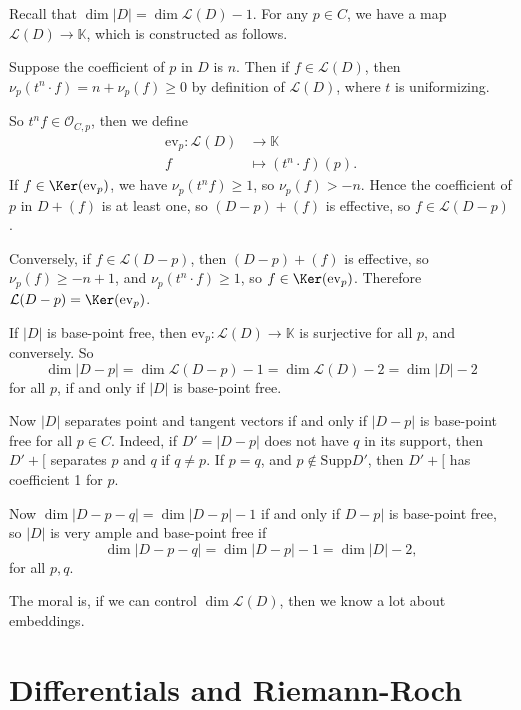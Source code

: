 \documentclass[12pt]{article}
\begin{document}
\begin{proofbox}
	Recall that $\dim |D| = \dim \mathcal{L}(D) - 1$. For any $p \in C$, we have a map $\mathcal{L}(D) \to \mathbb{K}$, which is constructed as follows.

	Suppose the coefficient of $p$ in $D$ is $n$. Then if $f \in \mathcal{L}(D)$, then $\nu_p(t^n \cdot f) = n + \nu_p (f) \geq 0$ by definition of $\mathcal{L}(D)$, where $t$ is uniformizing.

	So $t^n f \in \mathcal{O}_{C, p}$, then we define
	\begin{align*}
		\mathrm{ev}_p : \mathcal{L}(D) &\to \mathbb{K} \\
		f &\mapsto (t^n \cdot f)(p).
	\end{align*}
	If $f \in \Ker(\mathrm{ev}_p)$, we have $\nu_p(t^n f) \geq 1$, so $\nu_p (f) > -n$. Hence the coefficient of $p$ in $D + (f)$ is at least one, so $(D - p) + (f)$ is effective, so $f \in \mathcal{L}(D - p)$.

	Conversely, if $f \in \mathcal{L}(D - p)$, then $(D - p) + (f)$ is effective, so $\nu_p(f) \geq -n + 1$, and $\nu_p(t^n \cdot f) \geq 1$, so $f \in \Ker(\mathrm{ev}_p)$. Therefore $\mathcal{L}(D - p) = \Ker(\mathrm{ev}_p)$.

	If $|D|$ is base-point free, then $\mathrm{ev}_p : \mathcal{L}(D) \to \mathbb{K}$ is surjective for all $p$, and conversely. So
	\[
	\dim |D - p| = \dim \mathcal{L}(D - p) - 1 = \dim \mathcal{L}(D) - 2 = \dim |D| - 2
	\]
	for all $p$, if and only if $|D|$ is base-point free. 

	Now $|D|$ separates point and tangent vectors if and only if $|D - p|$ is base-point free for all $p \in C$. Indeed, if $D' = |D - p|$ does not have $q$ in its support, then $D' + [$ separates $p$ and $q$ if $q \neq p$. If $p = q$, and $p \not \in \mathrm{Supp}D'$, then $D' + [$ has coefficient 1 for $p$.

	Now $\dim |D - p - q| = \dim |D - p| - 1$ if and only if $D - p|$ is base-point free, so $|D|$ is very ample and base-point free if 
	\[
	\dim |D - p - q| = \dim |D - p| - 1 = \dim |D| - 2,
	\]
	for all $p, q$.
\end{proofbox}

The moral is, if we can control $\dim \mathcal{L}(D)$, then we know a lot about embeddings.

\newpage

\section{Differentials and Riemann-Roch}%
\label{sec:diff_rr}
\end{document}
